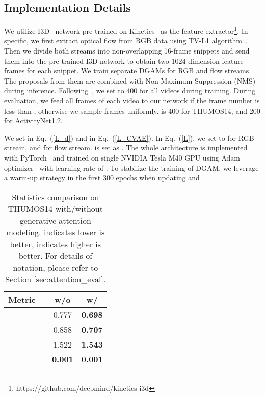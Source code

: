 \documentclass[10pt,twocolumn,letterpaper]{article}
\begin{document}
\subsection{Implementation Details}

We utilize I3D~\cite{carreira2017quo} network pre-trained on Kinetics~\cite{kay2017kinetics} as the feature extractor\footnote{https://github.com/deepmind/kinetics-i3d}.
In specific, we first extract optical flow from RGB data using TV-L1 algorithm~\cite{perez2013tv}.
Then we divide both streams into non-overlapping 16-frame snippets and send them into the pre-trained I3D network to obtain two 1024-dimension feature frames for each snippet.
We train separate DGAMs for RGB and flow streams. The proposals from them are combined with Non-Maximum Suppression (NMS) during inference.
Following~\cite{nguyen2018weakly,nguyen2019weakly}, we set  to 400 for all videos during training.
During evaluation, we feed all frames of each video to our network if the frame number is less than , otherwise we sample  frames uniformly.
 is 400 for THUMOS14, and 200 for ActivityNet1.2.




We set  in Eq.~(\ref{L_d}) and  in Eq.~(\ref{L_CVAE}). In Eq.~(\ref{L}), we set  to  for RGB stream, and  for flow stream.  is set as .
The whole architecture is implemented with PyTorch~\cite{paszke2017automatic} and trained on single NVIDIA Tesla M40 GPU using Adam optimizer~\cite{kingma2014adam} with learning rate of .
To stabilize the training of DGAM, we leverage a warm-up strategy in the first 300 epochs when updating  and .


\begin{table}[t]\small
\caption{Statistics comparison on THUMOS14 with/without generative attention modeling.  indicates lower is better,  indicates higher is better. For details of notation, please refer to Section \ref{sec:attention_eval}.}
\label{table:statistics}
\begin{center}
\begin{tabular}{c r|c c}
\hline
Metric & & w/o & w/ \\
\hline \hline
 &  & 0.777 & \textbf{0.698} \\
\hline
 &  & 0.858 & \textbf{0.707} \\
\hline
 &  & 1.522 & \textbf{1.543} \\
\hline
 &  & \textbf{0.001} & \textbf{0.001}\\
\hline
\end{tabular}
\end{center}
\vspace{-1em}
\end{table}
\end{document}
